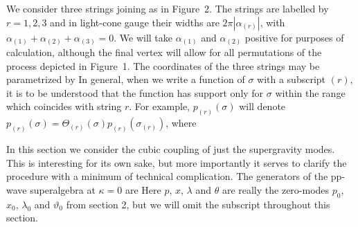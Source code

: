 
We consider three strings joining as in Figure~2.  The strings
are labelled by $r=1,2,3$ and in light-cone gauge their widths are
$2 \pi|\alpha_{(r)}|$, with
$\alpha_{(1)} + \alpha_{(2)} + \alpha_{(3)} = 0$.
We will take $\alpha_{(1)}$ and $\alpha_{(2)}$ positive
for purposes of calculation,
although the final vertex will allow for all permutations of
the process depicted in Figure~1.
The coordinates of the three strings may be  parametrized by
\eqn{}
In general,
when we write a function of $\sigma$ with a subscript ${(r)}$, it
is to be understood that the function has support only
for $\sigma$ within the range which coincides with string $r$.
For example,
$p_{(r)}(\sigma)$ will denote $p_{(r)}(\sigma) =
\Theta_{(r)}(\sigma)  p_{(r)}(\sigma_{(r)})$, where
\eqn{}


In this section we consider the cubic coupling of just the
supergravity modes.
This is interesting for its own sake, but more importantly it serves
to clarify the procedure with a minimum of technical complication.
The generators of the pp-wave superalgebra at $\kappa=0$ are
\eqn{}
Here $p$, $x$, $\lambda$ and $\theta$
are really the zero-modes $p_0$, $x_0$, $\lambda_0$ and $\vartheta_0$
from section 2, but we will omit the subscript throughout this section.

